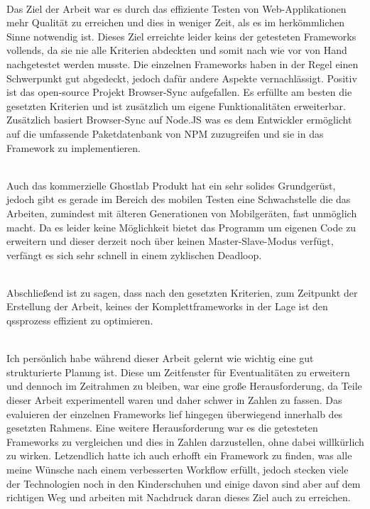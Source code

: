 \\Das Ziel der Arbeit war es durch das effiziente Testen von Web-Applikationen mehr Qualität zu erreichen und dies in weniger Zeit, als es im herkömmlichen Sinne notwendig ist. Dieses Ziel erreichte leider keins der getesteten \Gls{Framework}s vollends, da sie nie alle Kriterien abdeckten und somit nach wie vor von Hand nachgetestet werden musste. 
Die einzelnen \Gls{Framework}s haben in der Regel einen Schwerpunkt gut abgedeckt, jedoch dafür andere Aspekte vernachlässigt. Positiv ist das open-source Projekt Browser-Sync aufgefallen. Es erfüllte am besten die gesetzten Kriterien und ist zusätzlich um eigene Funktionalitäten erweiterbar. Zusätzlich basiert Browser-Sync auf Node.JS was es dem Entwickler ermöglicht auf die umfassende Paketdatenbank von \Gls{NPM} zuzugreifen und sie in das \Gls{Framework} zu implementieren. 

\\Auch das kommerzielle Ghostlab Produkt hat ein sehr solides Grundgerüst, jedoch gibt es gerade im Bereich des mobilen Testen eine Schwachstelle die das Arbeiten, zumindest mit älteren Generationen von Mobilgeräten, fast unmöglich macht. Da es leider keine Möglichkeit bietet das Programm um eigenen Code zu erweitern und dieser derzeit noch über keinen Master-Slave-Modus verfügt, verfängt es sich sehr schnell in einem zyklischen Deadloop.

\\Abschließend ist zu sagen, dass nach den gesetzten Kriterien, zum Zeitpunkt der Erstellung der Arbeit, keines der Komplettframeworks in der Lage ist den \Gls{qs}sprozess effizient zu optimieren.

\\Ich persönlich habe während dieser Arbeit gelernt wie wichtig eine gut strukturierte Planung ist. Diese um Zeitfenster für Eventualitäten zu erweitern und dennoch im Zeitrahmen zu bleiben, war eine große Herausforderung, da Teile dieser Arbeit experimentell waren und daher schwer in Zahlen zu fassen. Das evaluieren der einzelnen \Gls{Framework}s lief hingegen überwiegend innerhalb des gesetzten Rahmens. Eine weitere Herausforderung war es die getesteten \Gls{Framework}s zu vergleichen und dies in Zahlen darzustellen, ohne dabei willkürlich zu wirken. Letzendlich hatte ich auch erhofft ein \Gls{Framework} zu finden, was alle meine Wünsche nach einem verbesserten Workflow erfüllt, jedoch stecken viele der Technologien noch in den Kinderschuhen und einige davon sind aber auf dem richtigen Weg und arbeiten mit Nachdruck daran dieses Ziel auch zu erreichen.


